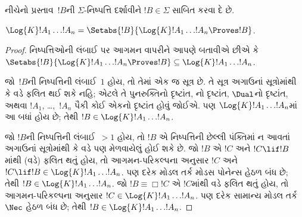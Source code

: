 નીચેનો પ્રસ્તાવ~$!B$ની $\Sigma$-નિષ્પત્તિ દર્શાવીને
$!B \in \Sigma$ સાબિત કરવા દે છે.

\begin{prop}
  $\Log{K} !A_1 \dots !A_n = \Setabs{!B}{\Log{K} !A_1 \dots !A_n \Proves !B}$.
\end{prop}

\begin{proof}
  નિષ્પત્તિઓની લંબાઈ પર આગમન વાપરીને આપણે બતાવીએ છીએ કે
  $\Setabs{!B}{\Log{K} !A_1 \dots !A_n \Proves !B} \subseteq
  \Log{K} !A_1 \dots !A_n$.

  જો~$!B$ની નિષ્પત્તિની લંબાઈ~$1$ હોય, તો તેમાં એક જ સૂત્ર
  છે. તે સૂત્ર અગાઉનાં સૂત્રોમાંથી \MP{} કે \Nec વડે ફલિત થઈ
  શકે નહિ; એટલે તે પુનરુક્તિનો દૃષ્ટાંત, નો દૃષ્ટાંત,
  $\Dual$નો દૃષ્ટાંત, અથવા $!A_1$, \dots,~$!A_n$ પૈકી કોઈ એકનો
  દૃષ્ટાંત હોવું જોઈએ. પણ $\Log{K}!A_1\dots!A_n$માં આ બધાં હોય છે;
  તેથી $!B \in \Log{K}!A_1 \dots !A_n$.

  જો $!B$ની નિષ્પત્તિની લંબાઈ~$> 1$ હોય, તો $!B$ એ નિષ્પત્તિની
  છેલ્લી પંક્તિમાં ન આવતાં અગાઉનાં સૂત્રોમાંથી \MP{} કે \Nec{}
  વડે પણ મેળવાયેલું હોઈ શકે છે. જો $!B$ એ $!C$ અને $!C \lif !B$માંથી
  (\MP વડે) ફલિત થતું હોય, તો આગમન-પરિકલ્પના અનુસાર $!C$ અને $!C \lif !B \in
  \Log{K}!A_1 \dots !A_n$. પણ દરેક મોડલ તર્ક મોડસ પોનેન્સ હેઠળ બંધ
  છે; તેથી $!B \in \Log{K}!A_1 \dots
  !A_n$. જો $!B \equiv \Box !C$ એ $!C$માંથી \Nec વડે ફલિત થતું હોય,
  તો આગમન-પરિકલ્પના અનુસાર $!C
  \in \Log{K}!A_1 \dots !A_n$. પણ દરેક સામાન્ય મોડલ તર્ક $\Nec$
  હેઠળ બંધ છે; તેથી $!B \in
  \Log{K}!A_1\dots!A_n$.


\end{proof}

